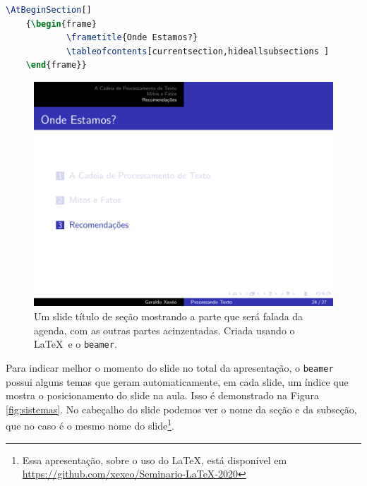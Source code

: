 \begin{lstlisting}[language=TeX,caption={Comando para títulos de seção automáticos no \texttt{beamer} com o tema Luebeck.},label={lst:autosec}]
    \AtBeginSection[]
    {\begin{frame}
            \frametitle{Onde Estamos?}
            \tableofcontents[currentsection,hideallsubsections ]
    \end{frame}}
\end{lstlisting}

\begin{figure}[hbt]
    \centering
    \includegraphics[width=\tam\linewidth,frame]{imagens/agendadomeio.png}
    \caption{Um slide título de seção mostrando a parte que será falada da agenda, com as outras partes acinzentadas. Criada usando o \LaTeX\  e o \texttt{beamer}.}
    \label{fig:meio}
\end{figure}



Para indicar melhor o momento do slide no total da apresentação, o \texttt{beamer} possui alguns temas que geram automaticamente, em cada slide, um índice que mostra o posicionamento do slide na aula. Isso é demonstrado na Figura \ref{fig:sistemas}. No cabeçalho do slide podemos ver o nome da seção e da subseção, que no caso é o mesmo nome do slide\footnote{Essa apresentação, sobre o uso do \LaTeX, está disponível em \url{https://github.com/xexeo/Seminario-LaTeX-2020}}.

